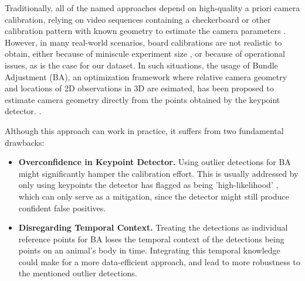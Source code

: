 \documentclass[sigconf, nonacm]{acmart}
\begin{document}
Traditionally, all of the named approaches depend on high-quality a priori camera calibration, relying on video sequences containing a checkerboard or other calibration pattern with known geometry to estimate the camera parameters \cite{zhang2002flexible}. 
However, in many real-world scenarios, board calibrations are not realistic to obtain, either because of miniscule experiment size \cite{Gnel2019}, or because of operational issues, as is the case for our dataset. In such situations, the usage of Bundle Adjustment (BA), an optimization framework where relative camera geometry and locations of 2D observations in 3D are esimated, has been proposed to estimate camera geometry directly from the points obtained by the keypoint detector. \cite{Karashchuk2021, Gnel2019}.\par
Although this approach can work in practice, it suffers from two fundamental drawbacks:
\begin{itemize}
    \item \textbf{Overconfidence in Keypoint Detector.} Using outlier detections for BA might significantly hamper the calibration effort. This is usually addressed by only using keypoints the detector has flagged as being 'high-likelihood' \cite{Gnel2019, Karashchuk2021}, which can only serve as a mitigation, since the detector might still produce confident false positives.
    \item \textbf{Disregarding Temporal Context.} Treating the detections as individual reference points for BA loses the temporal context of the detections being points on an animal's body in time. Integrating this temporal knowledge could make for a more data-efficient approach, and lead to more robustness to the mentioned outlier detections.
\end{itemize}
\end{document}

